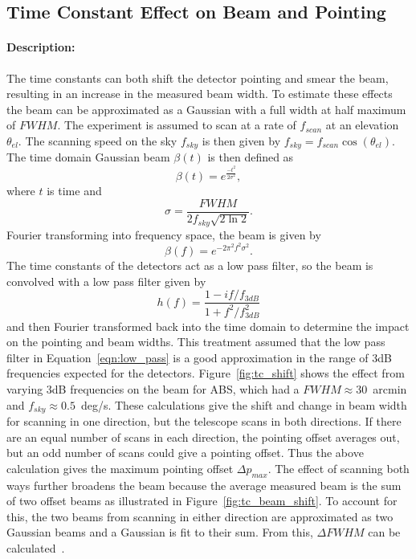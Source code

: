 \subsection{Time Constant Effect on Beam and Pointing}

\paragraph{Description:}
The time constants can both shift the detector pointing and smear the beam, resulting in an increase in the measured beam width. To estimate these effects the beam can be approximated as a Gaussian with a full width at half maximum of $FWHM$. The experiment is assumed to scan at a rate of $f_{scan}$ at an elevation $\theta_{el}$. The scanning speed on the sky $f_{sky}$ is then given by $f_{sky}=f_{scan}\cos{(\theta_{el})}$. The time domain Gaussian beam $\beta (t)$ is then defined as
\begin{equation}
\beta (t)=e^{\frac{-t^2}{2\sigma^2}},
\end{equation}
where $t$ is time and 
\begin{equation}
\sigma=\frac{FWHM}{2f_{sky}\sqrt{2\ln2}}.
\end{equation}
Fourier transforming into frequency space, the beam is given by 
\begin{equation}
\beta (f)=e^{-2 \pi^2 f^2 \sigma^2}.
\end{equation}
The time constants of the detectors act as a low pass filter, so the beam is convolved with a low pass filter given by
\begin{equation}\label{eqn:low_pass}
h(f)=\frac{1-if/f_{3dB}}{1+f^2/f_{3dB}^2}
\end{equation}
and then Fourier transformed back into the time domain to determine the impact on the pointing and beam widths. This treatment assumed that the low pass filter in Equation~\ref{eqn:low_pass} is a good approximation in the range of 3dB frequencies expected for the detectors. Figure~\ref{fig:tc_shift} shows the effect from varying 3dB frequencies on the beam for ABS, which had a $FWHM \approx 30$~arcmin and $f_{sky}\approx 0.5$~deg/s. These calculations give the shift and change in beam width for scanning in one direction, but the telescope scans in both directions. If there are an equal number of scans in each direction, the pointing offset averages out, but an odd number of scans could give a pointing offset. Thus the above calculation gives the maximum pointing offset $\Delta p_{max}$. The effect of scanning both ways further broadens the beam because the average measured beam is the sum of two offset beams as illustrated in Figure~\ref{fig:tc_beam_shift}. To account for this, the two beams from scanning in either direction are approximated as two Gaussian beams and a Gaussian is fit to their sum. From this, $\Delta FWHM$ can be calculated~\cite{Simon_Thesis_2016}. 

